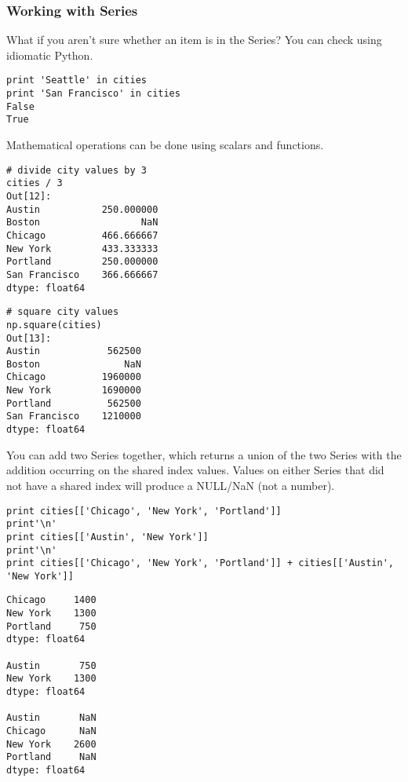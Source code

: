 \begin{frame}[fragile]\frametitle{Working with Series}
What if you aren't sure whether an item is in the Series? You can check using idiomatic Python.
\begin{lstlisting}
print 'Seattle' in cities
print 'San Francisco' in cities
False
True
\end{lstlisting}
\end{frame}

\begin{frame}[fragile]
Mathematical operations can be done using scalars and functions.
\begin{lstlisting}
# divide city values by 3
cities / 3
Out[12]:
Austin           250.000000
Boston                  NaN
Chicago          466.666667
New York         433.333333
Portland         250.000000
San Francisco    366.666667
dtype: float64
\end{lstlisting}
\end{frame}

\begin{frame}[fragile]
\begin{lstlisting}
# square city values
np.square(cities)
Out[13]:
Austin            562500
Boston               NaN
Chicago          1960000
New York         1690000
Portland          562500
San Francisco    1210000
dtype: float64
\end{lstlisting}
\end{frame}

\begin{frame}[fragile]
You can add two Series together, which returns a union of the two Series with the addition occurring on the shared index values. Values on either Series that did not have a shared index will produce a NULL/NaN (not a number).
\begin{lstlisting}
print cities[['Chicago', 'New York', 'Portland']]
print'\n'
print cities[['Austin', 'New York']]
print'\n'
print cities[['Chicago', 'New York', 'Portland']] + cities[['Austin', 'New York']]
\end{lstlisting}
\end{frame}

\begin{frame}[fragile]
\begin{lstlisting}
Chicago     1400
New York    1300
Portland     750
dtype: float64

Austin       750
New York    1300
dtype: float64

Austin       NaN
Chicago      NaN
New York    2600
Portland     NaN
dtype: float64
\end{lstlisting}
\end{frame}


